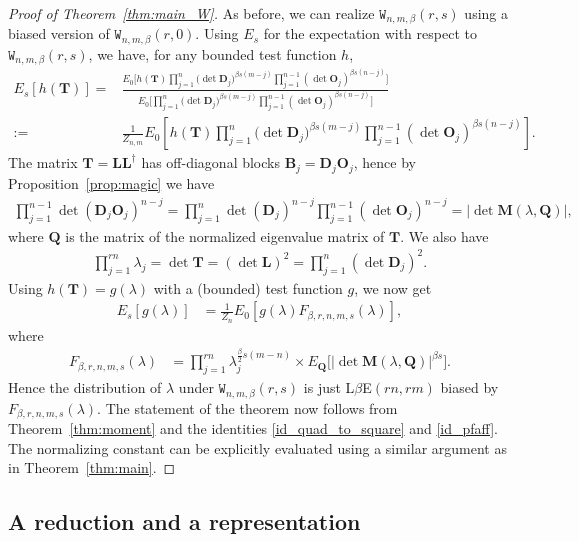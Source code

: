 \documentclass[pdftex]{sigma}
\numberwithin{equation}{section}
\theoremstyle{definition}
\newcommand{\T}{\dag}
\newcommand{\mbf}[1]{\mathbf{#1}}
\newcommand{\WW}{\mathtt{W}_{n,m, \beta}}
\begin{document}
\begin{proof}[Proof of Theorem~\ref{thm:main_W}]
As before, we can realize $\WW(r,s)$ using a biased version of $\WW(r,0)$. Using $E_s$ for the expectation with respect to $\WW(r,s)$, we have, for any bounded test function $h$,
\begin{align*}
E_{s}[h(\mbf{T})] ={}&\frac{E_{0}\big[h(\mbf{T})\prod_{j=1}^n \bigl(\det \mbf{D}_j\bigr)^{\beta s(m-j)} \prod_{j=1}^{n-1} (\det \mbf{O}_j)^{\beta s(n-j)} \big]} {E_{0}\big[\prod_{j=1}^n \bigl(\det \mbf{D}_j\bigr)^{\beta s(m-j)} \prod_{j=1}^{n-1} (\det \mbf{O}_j)^{\beta s(n-j)} \big]} \\
:={}& \frac{1}{Z_{n,m}} E_{0}\left[h(\mbf{T})\prod_{j=1}^n \bigl(\det \mbf{D}_j\bigr)^{\beta s(m-j)} \prod_{j=1}^{n-1} (\det \mbf{O}_j)^{\beta s(n-j)} \right].
\end{align*}
The matrix $\mbf{T}=\mbf{L} \mbf{L}^{\T}$ has
off-diagonal blocks $\mbf{B}_j=\mbf{D}_j \mbf{O}_j$, hence by Proposition~\ref{prop:magic} we have
\begin{align*}
 \prod_{j=1}^{n-1} \det(\mbf{D}_j \mbf{O}_j)^{n-j}=\prod_{j=1}^{n} \det(\mbf{D}_j)^{n-j} \prod_{j=1}^{n-1} (\det \mbf{O}_j)^{n-j}=|{\det \mbf{M}({\lambda}, \mbf{Q})}|,
\end{align*}
where $\mbf{Q}$ is the matrix of the normalized eigenvalue matrix of $\mbf{T}$.
We also have
\begin{align*}
 \prod_{j=1}^{rn} \lambda_j=\det \mbf{T}=(\det \mbf{L})^2=\prod_{j=1}^n (\det \mbf{D}_j)^2.
\end{align*}
Using $h(\mbf{T})=g({\lambda})$ with a (bounded) test function $g$, we now get
\begin{align*}
 E_{s}[g({\lambda})] & = \frac{1}{Z_n} E_{0}\left[g({\lambda}) F_{\beta,r,n,m, s}({\lambda})\right],
\end{align*}
where
 \begin{align*}
 \label{Reweight1}
 F_{\beta, r,n, m,s}({\lambda}) & =\prod_{j=1}^{rn} \lambda_j^{\frac{\beta}{2}s(m-n)} \times
 E_{\boldsymbol{Q}} \big[|{\det \mbf{M}({\lambda}, \mbf{Q})}|^{\beta s} \big].
\end{align*}
Hence the distribution of $\lambda$ under $\WW(r,s)$ is just L$\beta$E$(rn,rm)$ biased by $F_{\beta, r,n, m,s}({\lambda})$. The statement of the theorem now follows from Theorem~\ref{thm:moment} and the identities \eqref{id_quad_to_square} and \eqref{id_pfaff}. The normalizing constant can be explicitly evaluated using a similar argument as in Theorem~\ref{thm:main}.
\end{proof}



\subsection{A reduction and a representation}
\end{document}
